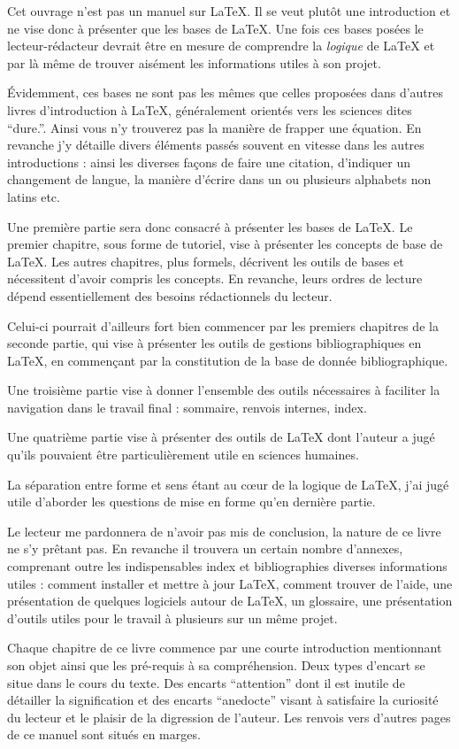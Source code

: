 Cet ouvrage n'est pas un manuel sur \LaTeX{}. Il se veut plutôt une introduction et ne vise donc à présenter que les bases de \LaTeX{}. Une fois ces bases posées le lecteur-rédacteur devrait être en mesure de comprendre la \emph{logique} de \LaTeX{} et par là même de trouver aisément les informations utiles à son projet.

Évidemment, ces bases ne sont pas les mêmes que celles proposées dans d'autres livres d'introduction à \LaTeX{}, généralement orientés vers les sciences dites \enquote{dure.}. 
Ainsi vous n'y trouverez pas la manière de frapper une équation. En revanche j'y détaille divers éléments passés souvent en vitesse dans les autres introductions : ainsi les diverses façons de faire une citation, d'indiquer un changement de langue, la manière d'écrire dans un ou plusieurs alphabets non latins etc.

Une première partie sera donc consacré à présenter les bases de \LaTeX. Le premier chapitre, sous forme de tutoriel, vise à présenter les concepts de base de \LaTeX. Les autres chapitres, plus formels, décrivent les outils de bases et nécessitent d'avoir compris les concepts. En revanche, leurs ordres de lecture dépend essentiellement des besoins rédactionnels du lecteur. 

Celui-ci pourrait d'ailleurs fort bien commencer par les premiers chapitres de la seconde partie, qui vise à présenter les outils de gestions bibliographiques en \LaTeX{}, en commençant par la constitution de la base de donnée bibliographique.

Une troisième partie vise à donner l'ensemble des outils nécessaires à faciliter la navigation dans le travail final : sommaire, renvois internes, index.

Une quatrième partie vise à présenter des outils de \LaTeX{} dont l'auteur a jugé qu'ils pouvaient être particulièrement utile en sciences humaines.

La séparation entre forme et sens étant au cœur de la logique de \LaTeX{}, j'ai jugé utile d'aborder les questions de mise en forme qu'en dernière partie.

Le lecteur me pardonnera de n'avoir pas mis de conclusion, la nature de ce livre ne s'y prêtant pas. En revanche il trouvera un certain nombre d'annexes, comprenant outre les indispensables index et bibliographies diverses informations utiles : comment installer et mettre à jour  \LaTeX{}, comment trouver de l'aide, une présentation de quelques logiciels autour de \LaTeX{}, un glossaire, une présentation d'outils utiles pour le travail à plusieurs sur un même projet.

Chaque chapitre de ce livre commence par une courte introduction mentionnant son objet ainsi que les pré-requis à sa compréhension. Deux types d'encart se situe dans le cours du texte. Des encarts \enquote{attention} dont il est inutile de détailler la signification et des encarts \enquote{anedocte} visant à satisfaire la curiosité du lecteur et le plaisir de la digression de l'auteur. Les renvois vers d'autres pages de ce manuel sont situés en marges.
